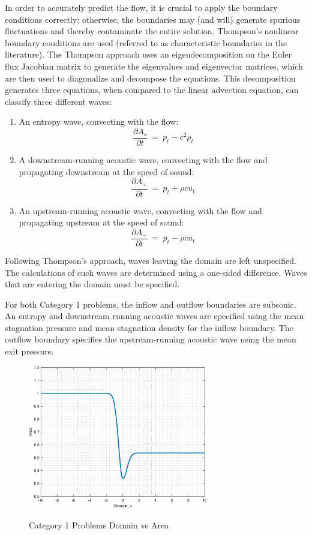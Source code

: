 \documentclass[conf]{new-aiaa}
\begin{document}
In order to accurately predict the flow, it is crucial to apply the boundary conditions correctly; otherwise, the boundaries may (and will) generate spurious fluctuations and thereby contaminate the entire solution. 
Thompson's nonlinear boundary conditions are used (referred to as characteristic boundaries in the literature).  
The Thompson approach \cite{Thompson1, Thompson2} uses an eigendecomposition on the Euler flux Jacobian matrix to generate the eigenvalues and eigenvector matrices, which are then used to diagonalize and decompose the equations. 
This decomposition generates three equations, when compared to the linear advection equation, can classify three different waves:
\begin{enumerate}
	\item An entropy wave, convecting with the flow:
		\begin{equation*}
			\frac{\partial{A_s}}{\partial{t}}~=~p_t-c^2\rho_t
		\end{equation*}
	\item A downstream-running acoustic wave, convecting with the flow and propagating downstream at the speed of sound:
		\begin{equation*}
			\frac{\partial{A_+}}{\partial{t}}~=~p_t+\rho{c}u_t
		\end{equation*}
	\item An upstream-running acoustic wave, convecting with the flow and propagating upstream at the speed of sound:
		\begin{equation*}
			\frac{\partial{A_-}}{\partial{t}}~=~p_t-\rho{c}u_t
		\end{equation*}
\end{enumerate}
Following Thompson's approach, waves leaving the domain are left unspecified. 
The calculations of such waves are determined using a one-sided difference. 
Waves that are entering the domain must be specified.

For both Category 1 problems, the inflow and outflow boundaries are subsonic. 
An entropy and downstream running acoustic waves are specified using the mean stagnation pressure and mean stagnation density for the inflow boundary.
The outflow boundary specifies the upstream-running acoustic wave using the mean exit pressure. 

\begin{figure}[hbtp!]
	\centering
{\includegraphics[width=0.7\textwidth]{Figures/Area}}
  	\caption{Category 1 Problems Domain vs Area}
  	\label{fig:Domain_Area}
\end{figure}
 
\end{document}
